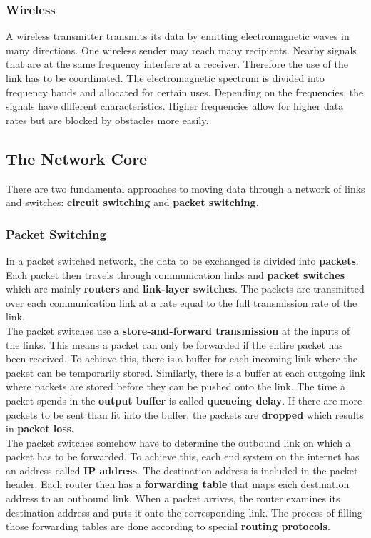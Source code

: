 \subsubsection{Wireless}
A wireless transmitter transmits its data by emitting electromagnetic waves in many directions. One wireless sender may reach many recipients. Nearby signals that are at the same frequency interfere at a receiver. Therefore the use of the link has to be coordinated. The electromagnetic spectrum is divided into frequency bands and allocated for certain uses. Depending on the frequencies, the signals have different characteristics. Higher frequencies allow for higher data rates but are blocked by obstacles more easily. 


\subsection{The Network Core}
There are two fundamental approaches to moving data through a network of links and switches: \textbf{circuit switching} and \textbf{packet switching}.

\subsubsection{Packet Switching}
In a packet switched network, the data to be exchanged is divided into \textbf{packets}. Each packet then travels through communication links and \textbf{packet switches} which are mainly \textbf{routers} and \textbf{link-layer switches}. The packets are transmitted over each communication link at a rate equal to the full transmission rate of the link. \\
The packet switches use a \textbf{store-and-forward transmission} at the inputs of the links. This means a packet can only be forwarded if the entire packet has been received. To achieve this, there is a buffer for each incoming link where the packet can be temporarily stored. Similarly, there is a buffer at each outgoing link where packets are stored before they can be pushed onto the link. The time a packet spends in the \textbf{output buffer} is called \textbf{queueing delay}. If there are more packets to be sent than fit into the buffer, the packets are \textbf{dropped} which results in \textbf{packet loss.}\\
The packet switches somehow have to determine the outbound link on which a packet has to be forwarded. To achieve this, each end system on the internet has an address called \textbf{IP address}. The destination address is included in the packet header. Each router then has a \textbf{forwarding table} that maps each destination address to an outbound link. When a packet arrives, the router examines its destination address and puts it onto the corresponding link. The process of filling those forwarding tables are done according to special \textbf{routing protocols}.

